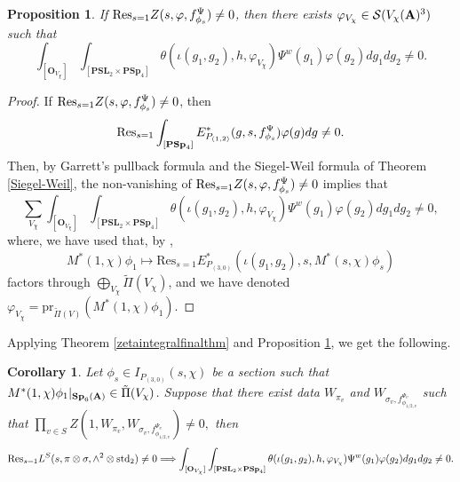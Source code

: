 \documentclass[11pt, reqno]{amsart}
\theoremstyle{plain}
\newtheorem{proposition}[theorem]{Proposition}
\newtheorem{corollary}[theorem]{Corollary}
\theoremstyle{definition}
\theoremstyle{remark}
\theoremstyle{plain}
\def\A{{\bf A}}
\def\Sp{{\mathbf{Sp}}}
\begin{document}
\begin{proposition}\label{First:Term:Application:pole}
If ${\rm Res}_{s=1}Z(s,\varphi,f^\Psi_{\phi_s}) \ne 0$, then there exists $\varphi_{V_\chi}\in \mathcal{S}(V_\chi(\A)^3)$ such that 
 \[ \int_{[\mathbf{O}_{V_\chi}]}\int_{[\mathbf{PSL}_2\times \mathbf{PSp}_4]}\theta(\iota(g_1,g_2),h,\varphi_{V_\chi})\Psi^{w}(g_1)\varphi(g_2)dg_1dg_2 \ne 0.\]
\end{proposition}
\begin{proof}
   If ${\rm Res}_{s=1}Z(s,\varphi,f^\Psi_{\phi_s}) \ne 0$, then 
$${\rm Res}_{s=1}  \int_{ [\mathbf{PSp}_4]} E^*_{P_{(1,2)}}(g,s, f^\Psi_{\phi_s})\varphi(g)dg \ne 0.$$
Then, by Garrett's pullback formula and the Siegel-Weil formula of Theorem \ref{Siegel-Weil}, the non-vanishing of  ${\rm Res}_{s=1}Z(s,\varphi,f^\Psi_{\phi_s}) \ne 0$ implies that 
$$\sum_{V_\chi} \int_{[\mathbf{O}_{V_\chi}]}\int_{[\mathbf{PSL}_2\times \mathbf{PSp}_4]}\theta(\iota(g_1,g_2),h,\varphi_{V_\chi})\Psi^{w}(g_1)\varphi(g_2)dg_1dg_2 \ne 0,$$
where, we have used that, by \cite[Theorem 4.9]{KudlaRallis},  $$M^*(1,\chi)\phi_{1}\mapsto \mathrm{Res}_{s = 1}E^*_{P_{(3,0)}}(\iota(g_1,g_2),s,M^*(s,\chi)\phi_s)$$ factors through $\bigoplus_{V_\chi} \tilde{\Pi}(V_\chi)$, and we have denoted $\varphi_{V_\chi} = \mathrm{pr}_{\tilde{\Pi}(V)}(M^*(1,\chi)\phi_{1})$.
\end{proof}

Applying Theorem \ref{zetaintegralfinalthm} and Proposition \ref{First:Term:Application:pole}, we get the following.

\begin{corollary}\label{cor_pole_SW1} 
Let $\phi_s\in I_{P_{(3,0)}}\left(s,\chi\right)$ be a section such that $M^*(1,\chi){\phi_1}|_{\Sp_6(\A)}\in\tilde{\Pi}(V_\chi)$. Suppose that there exist data $W_{\pi_v}$ and $W_{\sigma_v,f_{\phi_{1/2,v}}^{\Psi_v}}$ such that $\prod_{v \in S} Z\left(1,W_{\pi_v}, W_{\sigma_v,f_{\phi_{1/2,v}}^{\Psi_v}} \right) \ne 0,$ then \[{\rm Res}_{s=1}L^S(s, \pi \otimes \sigma, \wedge^2 \otimes {\rm std}_2) \ne 0 \Longrightarrow  \int_{[\mathbf{O}_{V_\chi}]}\int_{[\mathbf{PSL}_2\times \mathbf{PSp}_4]}\theta(\iota(g_1,g_2),h,\varphi_{V_\chi})\Psi^{w}(g_1)\varphi(g_2)dg_1dg_2 \ne 0.\]
\end{corollary}




\end{document}
